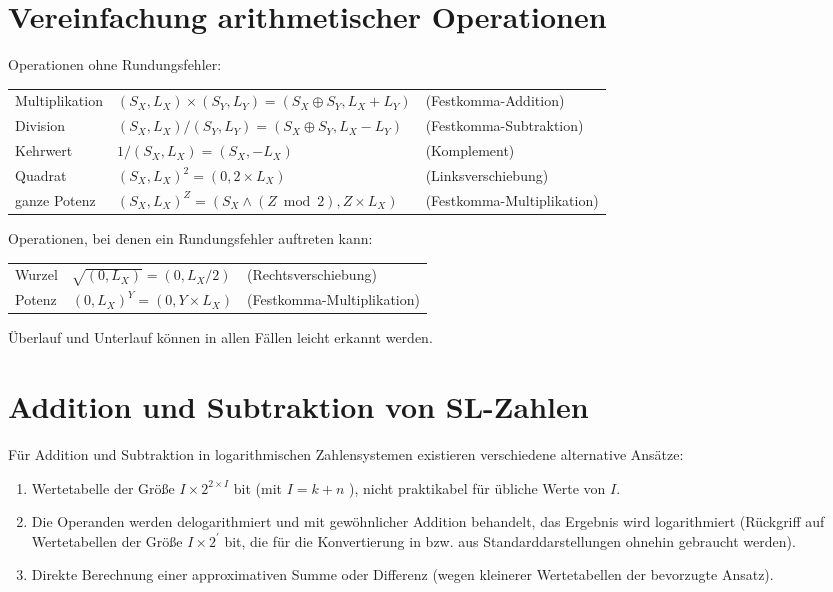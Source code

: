 \documentclass[10pt]{article}
\begin{document}
\section*{Vereinfachung arithmetischer Operationen}
Operationen ohne Rundungsfehler:

\begin{center}
\begin{tabular}{lll}
Multiplikation & $\left(S_{X}, L_{X}\right) \times\left(S_{Y}, L_{Y}\right)=\left(S_{X} \oplus S_{Y}, L_{X}+L_{Y}\right)$ & (Festkomma-Addition) \\
Division & $\left(S_{X}, L_{X}\right) /\left(S_{Y}, L_{Y}\right)=\left(S_{X} \oplus S_{Y}, L_{X}-L_{Y}\right)$ & (Festkomma-Subtraktion) \\
Kehrwert & $1 /\left(S_{X}, L_{X}\right)=\left(S_{X},-L_{X}\right)$ & (Komplement) \\
Quadrat & $\left(S_{X}, L_{X}\right)^{2}=\left(0,2 \times L_{X}\right)$ & (Linksverschiebung) \\
ganze Potenz & $\left(S_{X}, L_{X}\right)^{Z}=\left(S_{X} \wedge(Z \bmod 2), Z \times L_{X}\right)$ & (Festkomma-Multiplikation) \\
\end{tabular}
\end{center}

Operationen, bei denen ein Rundungsfehler auftreten kann:

\begin{center}
\begin{tabular}{lll}
Wurzel & $\sqrt{\left(0, L_{X}\right)}=\left(0, L_{X} / 2\right)$ & (Rechtsverschiebung) \\
Potenz & $\left(0, L_{X}\right)^{Y}=\left(0, Y \times L_{X}\right)$ & (Festkomma-Multiplikation) \\
\end{tabular}
\end{center}

Überlauf und Unterlauf können in allen Fällen leicht erkannt werden.

\section*{Addition und Subtraktion von SL-Zahlen}
Für Addition und Subtraktion in logarithmischen Zahlensystemen existieren verschiedene alternative Ansätze:

\begin{enumerate}
  \item Wertetabelle der Größe $I \times 2^{2 \times I}$ bit (mit $I=k+n$ ), nicht praktikabel für übliche Werte von $I$.
  \item Die Operanden werden delogarithmiert und mit gewöhnlicher Addition behandelt, das Ergebnis wird logarithmiert (Rückgriff auf Wertetabellen der Größe $I \times 2^{\prime}$ bit, die für die Konvertierung in bzw. aus Standarddarstellungen ohnehin gebraucht werden).
  \item Direkte Berechnung einer approximativen Summe oder Differenz (wegen kleinerer Wertetabellen der bevorzugte Ansatz).
\end{enumerate}
\end{document}
